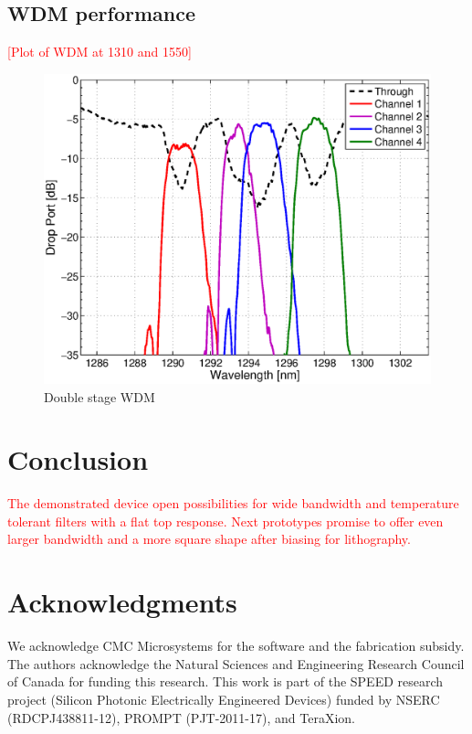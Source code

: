 \documentclass[letterpaper,10pt]{article}
\newcommand\todo[1]{\textcolor{red}{#1}}
\begin{document}
\subsection{WDM performance}
\todo{[Plot of WDM at 1310 and 1550]}
\begin{figure}[htbp]
	\centering
	\includegraphics[width=.60\columnwidth]{Double_P12}
	\caption{Double stage WDM }
	\label{fig:litho}
\end{figure}


\section{Conclusion}
\todo{The demonstrated device open possibilities for wide bandwidth and temperature tolerant filters with a flat top response. Next prototypes promise to offer even larger bandwidth and a more square shape after biasing for lithography.}













\section*{Acknowledgments}
We acknowledge CMC Microsystems for the  software and the fabrication subsidy. The authors acknowledge the Natural Sciences and Engineering Research Council of Canada for funding this research. This work is part of the SPEED research project (Silicon Photonic Electrically Engineered Devices) funded by NSERC (RDCPJ438811-12), PROMPT (PJT-2011-17), and TeraXion.



\end{document}
